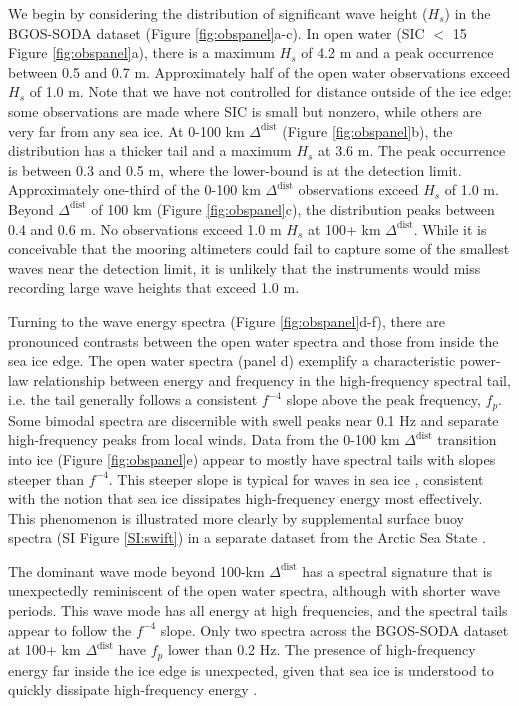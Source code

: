 \documentclass [11pt, proquest] {uwthesis}[2020/02/24]
\begin{document}
We begin by considering the distribution of significant wave height ($H_s$) in the BGOS-SODA dataset (Figure \ref{fig:obspanel}a-c). In open water (SIC $<$ 15\, Figure \ref{fig:obspanel}a), there is a maximum $H_s$ of 4.2 m and a peak occurrence between 0.5 and 0.7 m. Approximately half of the open water observations exceed $H_s$ of 1.0 m. Note that we have not controlled for distance outside of the ice edge: some observations are made where SIC is small but nonzero, while others are very far from any sea ice. At 0-100 km $\Delta^{ \mathrm{dist}}$ (Figure \ref{fig:obspanel}b), the distribution has a thicker tail and a maximum $H_s$ at 3.6 m. The peak occurrence is between 0.3 and 0.5 m, where the lower-bound is at the detection limit. Approximately one-third of the 0-100 km $\Delta^{ \mathrm{dist}}$ observations exceed $H_s$ of 1.0 m. Beyond $\Delta^{ \mathrm{dist}}$ of 100 km (Figure \ref{fig:obspanel}c), the distribution peaks between 0.4 and 0.6 m. No observations exceed 1.0 m $H_s$ at 100+ km $\Delta^{ \mathrm{dist}}$. While it is conceivable that the mooring altimeters could fail to capture some of the smallest waves near the detection limit, it is unlikely that the instruments would miss recording large wave heights that exceed 1.0 m.   

Turning to the wave energy spectra (Figure \ref{fig:obspanel}d-f), there are pronounced contrasts between the open water spectra and those from inside the sea ice edge. The open water spectra (panel d) exemplify a characteristic power-law relationship between energy and frequency in the high-frequency spectral tail, i.e. the tail generally follows a consistent \(f^{-4}\) slope above the peak frequency, \(f_p\). Some bimodal spectra are discernible with swell peaks near 0.1 Hz and separate high-frequency peaks from local winds. Data from the 0-100 km $\Delta^{ \mathrm{dist}}$ transition into ice (Figure \ref{fig:obspanel}e) appear to mostly have spectral tails with slopes steeper than $f^{-4}$. This steeper slope is typical for waves in sea ice \cite{Rogers2016DissipationSea, Thomson2021SpuriousMeasurements}, consistent with the notion that sea ice dissipates high-frequency energy most effectively. This phenomenon is illustrated more clearly by supplemental surface buoy spectra (SI Figure \ref{SI:swift}) in a separate dataset from the Arctic Sea State \cite{Thomson2018OverviewProgram}.  

The dominant wave mode beyond 100-km $\Delta^{ \mathrm{dist}}$ has a spectral signature that is unexpectedly reminiscent of the open water spectra, although with shorter wave periods. This wave mode has all energy at high frequencies, and the spectral tails appear to follow the \(f^{-4}\) slope. Only two spectra across the BGOS-SODA dataset at 100+ km $\Delta^{ \mathrm{dist}}$ have $f_p$ lower than 0.2 Hz. The presence of high-frequency energy far inside the ice edge is unexpected, given that sea ice is understood to quickly dissipate high-frequency energy \cite{Squire1980, Rogers2016DissipationSea, Thomson2021SpuriousMeasurements}.
\end{document}
